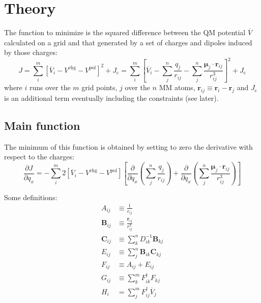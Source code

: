 \documentclass[a4paper]{report}
\newcommand{\bs}{\boldsymbol}
\newcommand{\mr}{\mathrm}
\begin{document}
\section*{Theory}

The function to minimize is the squared difference between the QM potential
$\overline{V}$ calculated on a grid and that generated by a set of charges and
dipoles induced by those charges:
\begin{equation}
J = \sum_i^m \left[ \overline{V}_i - V^\mr{chg} - V^\mr{pol} \right]^2 + J_\mr{c} = \sum_i^m
\left[ \overline{V}_i - \sum_j^n \frac{q_j}{r_{ij}} - \sum_j^n \frac{\bs{\mu}_j \cdot
\bs{r}_{ij}}{r_{ij}^3} \right]^2 + J_\mr{c}
\end{equation}
where $i$ runs over the $m$ grid points, $j$ over the $n$ MM atoms,
$\bs{r}_{ij}\equiv\bs{r}_i - \bs{r}_j$ and $J_\mr{c}$ is an additional term
eventually including the constraints (see later).

\subsection*{Main function}

The minimum of this function is obtained by setting to zero the derivative with
respect to the charges:
\begin{equation}
\label{deriv}
\frac{\partial J}{\partial q_x} = - \sum_i^m 2 \left[ \overline{V}_i - V^\mr{chg} -
V^\mr{pol} \right] \left[ \frac{\partial}{\partial q_x} \left(\sum_j^n
\frac{q_j}{r_{ij}}\right) + \frac{\partial}{\partial q_x} \left(\sum_j^n
\frac{\bs{\mu}_j \cdot \bs{r}_{ij}}{r_{ij}^3} \right)\right]
\end{equation}

Some definitions:
\begin{align}
A_{ij} &\equiv \frac{1}{r_{ij}} \\
\bs{B}_{ij} &\equiv \frac{\bs{r}_{ij}}{r_{ij}^3} \\
\bs{C}_{ij} &\equiv \sum_k^n D^{-1}_{ik}\bs{B}_{kj} \\
E_{ij} &\equiv \sum_j^n \bs{B}_{ik} \bs{C}_{kj} \\
F_{ij} &\equiv A_{ij} + E_{ij} \\
G_{ij} &\equiv \sum_k^m F_{ik}^\dagger F_{kj} \\
H_i &= \sum_j^m F_{ij}^\dagger \overline{V}_j 
\end{align}
\end{document}
